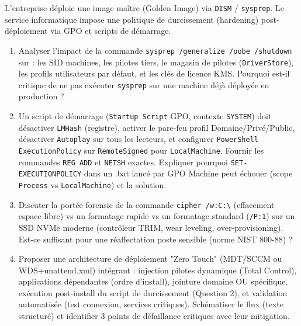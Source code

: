 \documentclass[11pt]{article}
\begin{document}
\begin{exercice}
L'entreprise déploie une image maître (Golden Image) via \texttt{DISM} / \texttt{sysprep}. Le service informatique impose une politique de durcissement (hardening) post-déploiement via GPO et scripts de démarrage.
\begin{enumerate}
    \item Analyser l'impact de la commande \texttt{sysprep /generalize /oobe /shutdown} sur : les SID machines, les pilotes tiers, le magasin de pilotes (\texttt{DriverStore}), les profils utilisateurs par défaut, et les clés de licence KMS. Pourquoi est-il critique de ne pas exécuter \texttt{sysprep} sur une machine déjà déployée en production ?
    \item Un script de démarrage (\texttt{Startup Script} GPO, contexte \texttt{SYSTEM}) doit désactiver \texttt{LMHash} (registre), activer le pare-feu profil Domaine/Privé/Public, désactiver \texttt{Autoplay} sur tous les lecteurs, et configurer \texttt{PowerShell ExecutionPolicy} sur \texttt{RemoteSigned} pour \texttt{LocalMachine}. Fournir les commandes \texttt{REG ADD} et \texttt{NETSH} exactes. Expliquer pourquoi \texttt{SET-EXECUTIONPOLICY} dans un .bat lancé par GPO Machine peut échouer (scope \texttt{Process} vs \texttt{LocalMachine}) et la solution.
    \item Discuter la portée forensic de la commande \texttt{cipher /w:C:\textbackslash} (effacement espace libre) vs un formatage rapide vs un formatage standard (\texttt{/P:1}) sur un SSD NVMe moderne (contrôleur TRIM, wear leveling, over-provisioning). Est-ce suffisant pour une réaffectation poste sensible (norme NIST 800-88) ?
    \item Proposer une architecture de déploiement "Zero Touch" (MDT/SCCM ou WDS+unattend.xml) intégrant : injection pilotes dynamique (Total Control), applications dépendantes (ordre d'install), jointure domaine OU spécifique, exécution post-install du script de durcissement (Question 2), et validation automatisée (test connexion, services critiques). Schématiser le flux (texte structuré) et identifier 3 points de défaillance critiques avec leur mitigation.
\end{enumerate}
\end{exercice}
\end{document}
